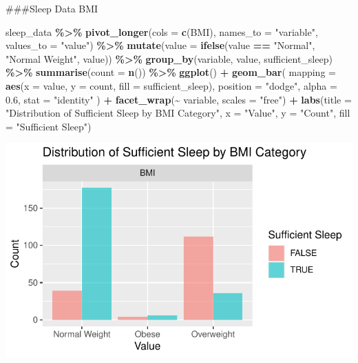 \documentclass[
  11pt,
]{article}
\newenvironment{Shaded}{\begin{snugshade}}{\end{snugshade}}
\newcommand{\AttributeTok}[1]{\textcolor[rgb]{0.13,0.29,0.53}{#1}}
\newcommand{\FloatTok}[1]{\textcolor[rgb]{0.00,0.00,0.81}{#1}}
\newcommand{\FunctionTok}[1]{\textcolor[rgb]{0.13,0.29,0.53}{\textbf{#1}}}
\newcommand{\NormalTok}[1]{#1}
\newcommand{\SpecialCharTok}[1]{\textcolor[rgb]{0.81,0.36,0.00}{\textbf{#1}}}
\newcommand{\StringTok}[1]{\textcolor[rgb]{0.31,0.60,0.02}{#1}}
\begin{document}
\#\#\#Sleep Data BMI

\begin{Shaded}
\begin{Highlighting}[]
\NormalTok{sleep\_data }\SpecialCharTok{\%\textgreater{}\%}
  \FunctionTok{pivot\_longer}\NormalTok{(}\AttributeTok{cols =} \FunctionTok{c}\NormalTok{(BMI), }\AttributeTok{names\_to =} \StringTok{"variable"}\NormalTok{, }\AttributeTok{values\_to =} \StringTok{"value"}\NormalTok{) }\SpecialCharTok{\%\textgreater{}\%}
  \FunctionTok{mutate}\NormalTok{(}\AttributeTok{value =} \FunctionTok{ifelse}\NormalTok{(value }\SpecialCharTok{==} \StringTok{"Normal"}\NormalTok{, }\StringTok{"Normal Weight"}\NormalTok{, value)) }\SpecialCharTok{\%\textgreater{}\%}
  \FunctionTok{group\_by}\NormalTok{(variable, value, sufficient\_sleep) }\SpecialCharTok{\%\textgreater{}\%}
  \FunctionTok{summarise}\NormalTok{(}\AttributeTok{count =} \FunctionTok{n}\NormalTok{()) }\SpecialCharTok{\%\textgreater{}\%}
  \FunctionTok{ggplot}\NormalTok{() }\SpecialCharTok{+}
  \FunctionTok{geom\_bar}\NormalTok{(}
    \AttributeTok{mapping =} \FunctionTok{aes}\NormalTok{(}\AttributeTok{x =}\NormalTok{ value, }\AttributeTok{y =}\NormalTok{ count, }\AttributeTok{fill =}\NormalTok{ sufficient\_sleep),}
    \AttributeTok{position =} \StringTok{"dodge"}\NormalTok{,   }
    \AttributeTok{alpha =} \FloatTok{0.6}\NormalTok{,}
    \AttributeTok{stat =} \StringTok{"identity"}
\NormalTok{  ) }\SpecialCharTok{+}
  \FunctionTok{facet\_wrap}\NormalTok{(}\SpecialCharTok{\textasciitilde{}}\NormalTok{ variable, }\AttributeTok{scales =} \StringTok{"free"}\NormalTok{) }\SpecialCharTok{+}
  \FunctionTok{labs}\NormalTok{(}\AttributeTok{title =} \StringTok{"Distribution of Sufficient Sleep by BMI Category"}\NormalTok{,}
       \AttributeTok{x =} \StringTok{"Value"}\NormalTok{, }
       \AttributeTok{y =} \StringTok{"Count"}\NormalTok{, }
       \AttributeTok{fill =} \StringTok{"Sufficient Sleep"}\NormalTok{)}
\end{Highlighting}
\end{Shaded}

\begin{center}\includegraphics[width=0.7\linewidth]{SleepHelath_files/figure-latex/unnamed-chunk-20-1} \end{center}
\end{document}
